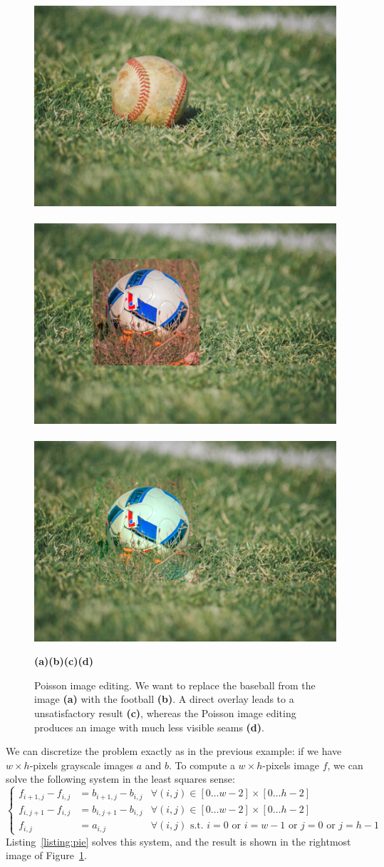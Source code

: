 \documentclass[notitlepage,oneside]{book}
\begin{document}
\begin{figure}[b]
    \centering
    \includegraphics[width=.24\linewidth]{img/pie_baseball.png}~
    ~
    \includegraphics[width=.24\linewidth]{img/pie_overlay.png}~
    \includegraphics[width=.24\linewidth]{img/pie_poisson.png}
    \\
    \begin{flushleft}
    {\hspace{.18\linewidth}\textbf{(a)\hspace{.15\linewidth}(b)\hspace{.14\linewidth}(c)\hspace{.22\linewidth}(d)}}
    \end{flushleft}
    \caption{Poisson image editing. We want to replace the baseball from the image \textbf{(a)} with the football \textbf{(b)}. A direct overlay leads to a unsatisfactory result \textbf{(c)}, whereas the Poisson image editing produces an image with much less visible seams \textbf{(d)}.}
    \label{fig:pie}
\end{figure}

We can discretize the problem exactly as in the previous example: if we have $w \times h$-pixels grayscale images $a$ and $b$.
To compute a $w \times h$-pixels image $f$, we can solve the following system in the least squares sense:
\begin{equation}
\label{eq:pie}
\left \{ \begin{array}{rll}
f_{i+1, j}-f_{i,j} & = b_{i+1, j}-b_{i,j} & \forall (i,j) \in [0 \dots w-2] \times [0\dots h-2]\\
f_{i, j+1}-f_{i,j} & = b_{i, j+1}-b_{i,j} & \forall (i,j) \in [0 \dots w-2] \times [0\dots h-2]\\
f_{i,j}            & = a_{i,j}            & \forall (i,j) \text{~s.t.~} i=0 \text{~or~} i=w-1 \text{~or~} j=0 \text{~or~} j=h-1
\end{array} \right.
\end{equation}
Listing~\ref{listing:pie} solves this system, and the result is shown in the rightmost image of Figure~\ref{fig:pie}.
\end{document}
